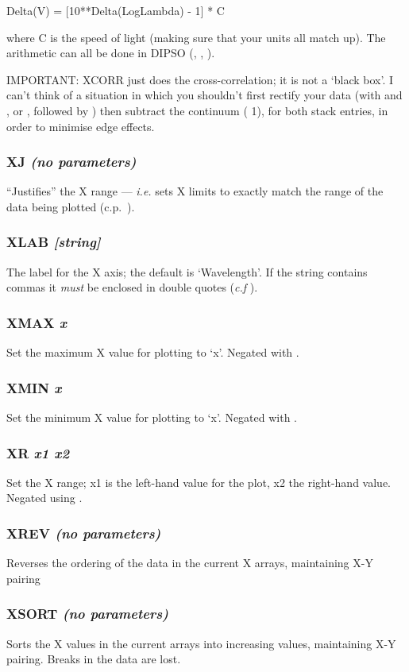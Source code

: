 \documentclass[twoside,11pt,noabs,nolof]{starlink}
\providecommand{\dipcom}[3]{\subsubsection*{\label{COM:#1}\textbf{#1} \emph{#2}}}
\begin{document}
\begin{terminalv}
Delta(V) = [10**{Delta(LogLambda)} - 1] * C
\end{terminalv}

where C is the speed of light (making sure that your units all match
up). The arithmetic can all be done in DIPSO
(, ,  ).

IMPORTANT: XCORR just does the cross-correlation; it is not a
`black box'. I can't think of a situation in which you shouldn't first
rectify your data (with   and ,  or ,  followed by )  then
subtract the continuum ( 1), for both stack entries, in order to
minimise edge effects.

\dipcom{XJ}{(no parameters)}{Sets X limits to match exactly the range of the data being plotted}
``Justifies'' the X range --- \emph{i.e.} sets X limits to exactly
match the range of the data being plotted (c.p.\ ).

\dipcom{XLAB}{[string]}{Sets the label for the X axis}
The label for the X axis; the default is `Wavelength'. If the string
contains commas it \emph{must} be enclosed in double quotes (\textit{c.f}
).

\dipcom{XMAX}{x}{Sets the maximum X value to be plotted}
Set the maximum X value for plotting to `x'.
Negated with .

\dipcom{XMIN}{x}{Sets the minimum X value to be plotted}
Set the minimum X value for plotting to `x'.
Negated with .

\dipcom{XR}{x1 x2}{Sets the minimum and maximum X value to be plotted}
Set the X range; x1 is the left-hand value for the plot, x2 the
right-hand value. Negated using .

\dipcom{XREV}{(no parameters)}{Reverses the ordering of data in the current arrays}
Reverses the ordering of the data in the current X arrays, maintaining
X-Y pairing

\dipcom{XSORT}{(no parameters)}{Sorts the X values in the current arrays into ascending order}
Sorts the X values in the current arrays into increasing values,
maintaining X-Y pairing. Breaks in the data are lost.
\end{document}
